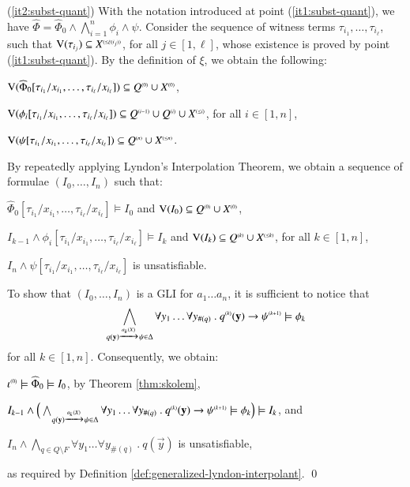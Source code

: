 \documentclass{llncs}
\begin{document}
{  \noindent(\ref{it2:subst-quant}) With the notation introduced at
  point (\ref{it1:subst-quant}), we have $\widehat{\Phi} =
  \widehat{\Phi}_0 \wedge \bigwedge_{i=1}^n \phi_i \wedge
  \psi$. Consider the sequence of witness terms $\tau_{i_1}, \ldots,
  \tau_{i_\ell}$, such that $\mathrm{V}({\tau_{i_j}}) \subseteq {X}^{\scriptscriptstyle{({\leq
    \xi(i_j)})}}$, for all $j \in [1,\ell]$, whose existence is proved by
  point (\ref{it1:subst-quant}). By the definition of $\xi$, we obtain
  the following: \begin{compactitem}
  \item $\mathrm{V}({\widehat{\Phi}_0[\tau_{i_1}/x_{i_1}, \ldots, \tau_{i_\ell}/x_{i_\ell}]}) \subseteq 
    {Q}^{\scriptscriptstyle{({0})}} \cup {X}^{\scriptscriptstyle{({0})}}$, 
  \item $\mathrm{V}({\phi_i[\tau_{i_1}/x_{i_1}, \ldots, \tau_{i_\ell}/x_{i_\ell}]}) \subseteq 
    {Q}^{\scriptscriptstyle{({i-1})}} \cup {Q}^{\scriptscriptstyle{({i})}} \cup {X}^{\scriptscriptstyle{({\leq i})}}$, for all $i \in [1,n]$,
  \item $\mathrm{V}({\psi[\tau_{i_1}/x_{i_1}, \ldots, \tau_{i_\ell}/x_{i_\ell}]}) \subseteq 
    {Q}^{\scriptscriptstyle{({n})}} \cup {X}^{\scriptscriptstyle{({\leq n})}}$. 
  \end{compactitem}
  By repeatedly applying Lyndon's Interpolation Theorem, we obtain a
  sequence of formulae $(I_0, \ldots, I_n)$ such that: \begin{compactitem}
    \item $\widehat{\Phi}_0[\tau_{i_1}/x_{i_1}, \ldots,
      \tau_{i_\ell}/x_{i_\ell}] \models I_0$ and $\mathrm{V}({I_0}) \subseteq
      {Q}^{\scriptscriptstyle{({0})}} \cup {X}^{\scriptscriptstyle{({0})}}$,
    \item $I_{k-1} \wedge \phi_i[\tau_{i_1}/x_{i_1}, \ldots,
      \tau_{i_\ell}/x_{i_\ell}] \models I_k$ and $\mathrm{V}({I_k}) \subseteq
      {Q}^{\scriptscriptstyle{({k})}} \cup {X}^{\scriptscriptstyle{({\leq k})}}$, for all $k \in [1,n]$,
    \item $I_n \wedge \psi[\tau_{i_1}/x_{i_1}, \ldots,
      \tau_{i_\ell}/x_{i_\ell}]$ is unsatisfiable.
  \end{compactitem}
  To show that $(I_0,\ldots,I_n)$ is a GLI for $a_1\ldots a_n$, it is
  sufficient to notice that \[\bigwedge_{q(\mathbf y) \xrightarrow{{\scriptscriptstyle a_k(X)}}_{{\scriptstyle }}
    \psi \in \Delta} \forall y_1 \ldots \forall y_{\#(q)} ~.~
  {q}^{\scriptscriptstyle{({k})}}(\mathbf y) \rightarrow {\psi}^{\scriptscriptstyle{({k+1})}} \models \phi_k\]
  for all $k \in [1,n]$. Consequently, we obtain: \begin{compactitem}
    \item ${\iota}^{\scriptscriptstyle{({0})}} \models \widehat{\Phi}_0 \models I_0$, by
      Theorem \ref{thm:skolem},
    \item $I_{k-1} \wedge \Big(\bigwedge_{q(\mathbf y) \xrightarrow{{\scriptscriptstyle a_k(X)}}_{{\scriptstyle }}
      \psi \in \Delta} \forall y_1 \ldots \forall y_{\#(q)} ~.~
      {q}^{\scriptscriptstyle{({k})}}(\mathbf y) \rightarrow {\psi}^{\scriptscriptstyle{({k+1})}} \models
      \phi_k\Big) \models I_k$, and 
    \item $I_n \wedge \bigwedge_{q \in Q \setminus F} \forall y_1
      \ldots \forall y_{\#(q)} ~.~ q(\vec{y})$ is
      unsatisfiable,
  \end{compactitem}
  as required by Definition
  \ref{def:generalized-lyndon-interpolant}. \qed}
\end{document}
